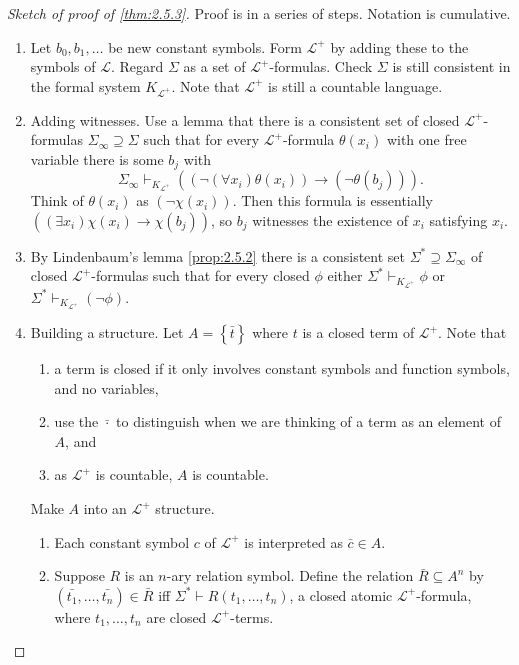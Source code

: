 \documentclass{article}
\newcommand{\rb}[1]{\left( #1 \right)}
\newcommand{\cb}[1]{\left\{ #1 \right\}}
\newcommand{\notb}[1]{\rb{\neg #1}}
\newcommand{\impb}[2]{\rb{#1 \rightarrow #2}}
\newcommand{\fab}[1]{\rb{\forall #1}}
\newcommand{\teb}[1]{\rb{\exists #1}}
\theoremstyle{definition}\newtheorem{definition}{Definition}[subsection]
\theoremstyle{definition}\newtheorem{remark}[definition]{Remark}
\theoremstyle{definition}\newtheorem*{example}{Example}
\theoremstyle{definition}\newtheorem*{note}{Note}
\begin{document}
\begin{proof}[Sketch of proof of \ref{thm:2.5.3}]
Proof is in a series of steps. Notation is cumulative.
\begin{enumerate}
\item Let $ b_0, b_1, \dots $ be new constant symbols. Form $ \mathcal{L}^+ $ by adding these to the symbols of $ \mathcal{L} $. Regard $ \Sigma $ as a set of $ \mathcal{L}^+ $-formulas. Check $ \Sigma $ is still consistent in the formal system $ K_{\mathcal{L}^+} $. Note that $ \mathcal{L}^+ $ is still a countable language.
\item Adding witnesses. Use a lemma that there is a consistent set of closed $ \mathcal{L}^+ $-formulas $ \Sigma_\infty \supseteq \Sigma $ such that for every $ \mathcal{L}^+ $-formula $ \theta\rb{x_i} $ with one free variable there is some $ b_j $ with
$$ \Sigma_\infty \vdash_{K_{\mathcal{L}^+}} \impb{\notb{\fab{x_i}\theta\rb{x_i}}}{\notb{\theta\rb{b_j}}}. $$
Think of $ \theta\rb{x_i} $ as $ \notb{\chi\rb{x_i}} $. Then this formula is essentially $ \impb{\teb{x_i}\chi\rb{x_i}}{\chi\rb{b_j}} $, so $ b_j $ witnesses the existence of $ x_i $ satisfying $ x_i $.
\item By Lindenbaum's lemma \ref{prop:2.5.2} there is a consistent set $ \Sigma^* \supseteq \Sigma_\infty $ of closed $ \mathcal{L}^+ $-formulas such that for every closed $ \phi $ either $ \Sigma^* \vdash_{K_{\mathcal{L}^+}} \phi $ or $ \Sigma^* \vdash_{K_{\mathcal{L}^+}} \notb{\phi} $.
\item Building a structure. Let $ A = \cb{\bar{t}} $ where $ t $ is a closed term of $ \mathcal{L}^+ $. Note that
\begin{enumerate}
\item a term is closed if it only involves constant symbols and function symbols, and no variables,
\item use the $ \bar{\cdot} $ to distinguish when we are thinking of a term as an element of $ A $, and
\item as $ \mathcal{L}^+ $ is countable, $ A $ is countable.
\end{enumerate}
Make $ A $ into an $ \mathcal{L}^+ $ structure.
\begin{enumerate}
\item Each constant symbol $ c $ of $ \mathcal{L}^+ $ is interpreted as $ \bar{c} \in A $.
\item Suppose $ R $ is an $ n $-ary relation symbol. Define the relation $ \bar{R} \subseteq A^n $ by $ \rb{\bar{t_1}, \dots, \bar{t_n}} \in \bar{R} $ iff $ \Sigma^* \vdash R\rb{t_1, \dots, t_n} $, a closed atomic $ \mathcal{L}^+ $-formula, where $ t_1, \dots, t_n $ are closed $ \mathcal{L}^+ $-terms.

\end{enumerate}
\end{enumerate}
\end{proof}
\end{document}
